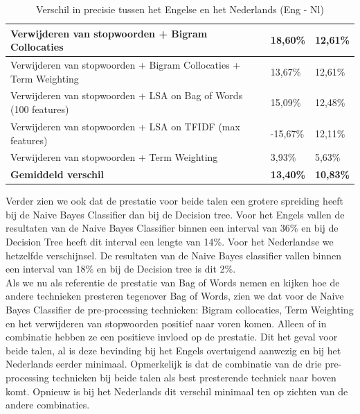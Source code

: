 \begin{table}[h]
\begin{adjustbox}{width=1\textwidth}
\begin{tabular}{|l|l|l|}
Verwijderen van stopwoorden + Bigram Collocaties                                     & 18,60\%                                           & 12,61\%                                  \\ \hline
Verwijderen van stopwoorden + Bigram Collocaties + Term Weighting                    & 13,67\%                                           & 12,61\%                                  \\ \hline
Verwijderen van stopwoorden + LSA on Bag of Words (100 features)                     & 15,09\%                                           & 12,48\%                                  \\ \hline
Verwijderen van stopwoorden + LSA on TFIDF (max features)                            & -15,67\%                                          & 12,11\%                                  \\ \hline
Verwijderen van stopwoorden + Term Weighting                                         & 3,93\%                                            & 5,63\%                                   \\ \hline
{\bf Gemiddeld verschil}                                                             & {\bf 13,40\%}                                     & {\bf 10,83\%}                            \\ \hline
\end{tabular}
\end{adjustbox}
\caption{Verschil in precisie tussen het Engelse en het Nederlands (Eng - Nl)}
\end{table}

Verder zien we ook dat de prestatie voor beide talen een grotere spreiding heeft bij de Naive Bayes Classifier dan bij de Decision tree. Voor het Engels vallen de resultaten van de Naive Bayes Classifier binnen een interval van 36\% en bij de Decision Tree heeft dit interval een lengte van 14\%. Voor het Nederlandse we hetzelfde verschijnsel. De resultaten van de Naive Bayes classifier vallen binnen een interval van 18\% en bij de Decision tree is dit 2\%.\\

Als we nu als referentie de prestatie van Bag of Words nemen en kijken hoe de andere technieken presteren tegenover Bag of Words, zien we dat voor de Naive Bayes Classifier de pre-processing technieken: Bigram collocaties, Term Weighting en het verwijderen van stopwoorden positief naar voren komen. Alleen of in combinatie hebben ze een positieve invloed op de prestatie. Dit het geval voor beide talen, al is deze bevinding bij het Engels overtuigend aanwezig en bij het Nederlands eerder minimaal. Opmerkelijk is dat de combinatie van de drie pre-processing technieken bij beide talen als best presterende techniek naar boven komt. Opnieuw is bij het Nederlands dit verschil minimaal ten op zichten van de andere combinaties.\\

